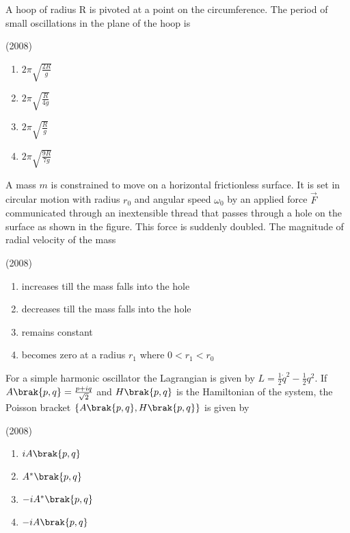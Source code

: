     \item A hoop of radius R is pivoted at a point on the circumference. The period of small oscillations in the plane of the hoop is 
    
    \hfill{(2008)}

        \begin{multicols}{4}
            \begin{enumerate}
                \item $2\pi\sqrt{\frac{2R}{g}}$
                \item $2\pi\sqrt{\frac{R}{4g}}$
                \item $2\pi\sqrt{\frac{R}{g}}$
                \item $2\pi\sqrt{\frac{9R}{7g}}$
            \end{enumerate}
        \end{multicols}
        
    \item A mass $m$ is constrained to move on a horizontal frictionless surface. It is set in circular motion with radius $r_0$ and angular speed $\omega_0$ by an applied force $\overrightarrow{F}$ communicated through an inextensible thread that passes through a hole on the surface as shown in the figure. This force is suddenly doubled. The magnitude of radial velocity of the mass 
    
    \hfill{(2008)}

    

            \begin{enumerate}
                \item increases till the mass falls into the hole
                \item decreases till the mass falls into the hole
                \item remains constant
                \item becomes zero at a radius $r_1$ where $0<r_1<r_0$
            \end{enumerate}


    \item For a simple harmonic oscillator the Lagrangian is given by $L=\frac{1}{2}\dot{q}^2-\frac{1}{2}q^2$. If $A\brak{p, q}=\frac{p+iq}{\sqrt{2}}$ and $H\brak{p,q}$ is the Hamiltonian of the system, the Poisson bracket $\left\{ A\brak{p,q},H\brak{p,q}\right\}$ is given by
    
    \hfill{(2008)}

    \begin{multicols}{4}
        \begin{enumerate}
            \item $iA\brak{p,q}$
            \item $A^*\brak{p,q}$
            \item $-iA^*\brak{p,q}$
            \item $-iA\brak{p,q}$
        \end{enumerate}
    \end{multicols}

